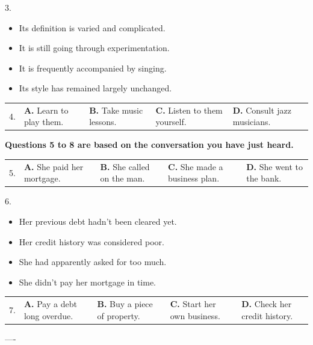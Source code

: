 \documentclass[UTF8,11pt]{ctexart}
\begin{document}
3.


\begin{itemize}[leftmargin=2em,itemsep=.2em,topsep=.4em]\item[A.] Its definition is varied and complicated.
\item[B.] It is still going through experimentation.
\item[C.] It is frequently accompanied by singing.
\item[D.] Its style has remained largely unchanged.
\end{itemize}

\noindent\begin{tabularx}{\linewidth}{@{}lXXXX@{}}4. & \textbf{A.} Learn to play them. & \textbf{B.} Take music lessons. & \textbf{C.} Listen to them yourself. & \textbf{D.} Consult jazz musicians.\\\end{tabularx}\par

\textbf{Questions 5 to 8 are based on the conversation you have just heard.}


\noindent\begin{tabularx}{\linewidth}{@{}lXXXX@{}}5. & \textbf{A.} She paid her mortgage. & \textbf{B.} She called on the man. & \textbf{C.} She made a business plan. & \textbf{D.} She went to the bank.\\\end{tabularx}\par

6.


\begin{itemize}[leftmargin=2em,itemsep=.2em,topsep=.4em]\item[A.] Her previous debt hadn't been cleared yet.
\item[B.] Her credit history was considered poor.
\item[C.] She had apparently asked for too much.
\item[D.] She didn't pay her mortgage in time.
\end{itemize}

\noindent\begin{tabularx}{\linewidth}{@{}lXXXX@{}}7. & \textbf{A.} Pay a debt long overdue. & \textbf{B.} Buy a piece of property. & \textbf{C.} Start her own business. & \textbf{D.} Check her credit history.\\\end{tabularx}\par

----
\end{document}
